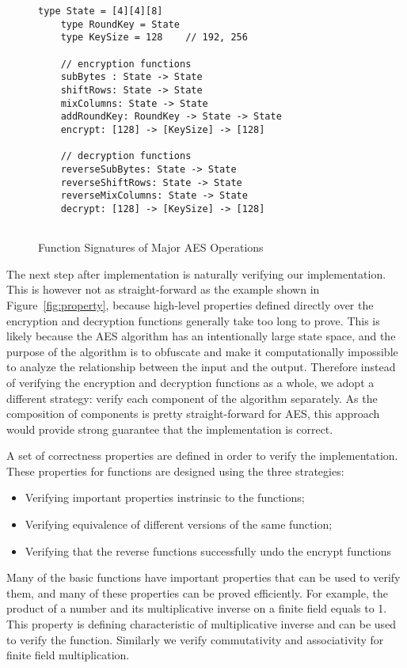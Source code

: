 \documentclass[a4paper, notitlepage]{report}
\begin{document}
\begin{figure}
  \begin{lstlisting}[frame=single]
    type State = [4][4][8]
    type RoundKey = State
    type KeySize = 128    // 192, 256

    // encryption functions
    subBytes : State -> State
    shiftRows: State -> State
    mixColumns: State -> State
    addRoundKey: RoundKey -> State -> State
    encrypt: [128] -> [KeySize] -> [128]

    // decryption functions
    reverseSubBytes: State -> State
    reverseShiftRows: State -> State
    reverseMixColumns: State -> State
    decrypt: [128] -> [KeySize] -> [128]
    
  \end{lstlisting}
  \caption{Function Signatures of Major AES Operations}
  \label{fig:functions}
\end{figure}

The next step after implementation is naturally verifying our implementation.
This is however not as straight-forward as the example shown in
Figure~\ref{fig:property}, because high-level properties defined directly over
the encryption and decryption functions generally take too long to prove.
This is likely because the AES algorithm has an intentionally large state space,
and the purpose of the algorithm is to obfuscate and make it computationally impossible
to analyze the relationship between the input and the output.
Therefore instead of verifying the encryption and decryption functions as a whole,
we adopt a different strategy: verify each component of the algorithm separately.
As the composition of components is pretty straight-forward for AES, this approach
would provide strong guarantee that the implementation is correct.

A set of correctness properties are defined in order to verify the implementation.
These properties for functions are designed using the three strategies:
\begin{itemize}
\item Verifying important properties instrinsic to the functions;
\item Verifying equivalence of different versions of the same function;
\item Verifying that the reverse functions successfully undo the encrypt functions
\end{itemize} 

Many of the basic functions have important properties that can be used to verify
them, and many of these properties can be proved efficiently. For example, the
product of a number and its multiplicative inverse on a finite field equals to 1.
This property is defining characteristic of multiplicative inverse and can be used
to verify the function. Similarly we verify commutativity and associativity for
finite field multiplication.
\end{document}
